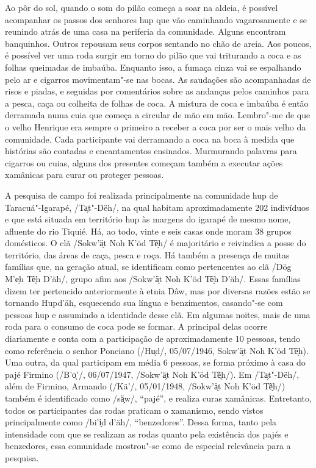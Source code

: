 Ao pôr do sol, quando o som do pilão começa a soar na aldeia, é possível
acompanhar os passos dos senhores hup que vão caminhando vagarosamente e
se reunindo atrás de uma casa na periferia da comunidade. Alguns
encontram banquinhos. Outros repousam seus corpos sentando no chão de
areia. Aos poucos, é possível ver uma roda surgir em torno do pilão que
vai triturando a coca e as folhas queimadas de imbaúba. Enquanto isso, a
fumaça cinza vai se espalhando pelo ar e cigarros movimentam"-se nas
bocas. As saudações são acompanhadas de risos e piadas, e seguidas por
comentários sobre as andanças pelos caminhos para a pesca, caça ou
colheita de folhas de coca. A mistura de coca e imbaúba é então
derramada numa cuia que começa a circular de mão em mão. Lembro"-me de
que o velho Henrique era sempre o primeiro a receber a coca por ser o
mais velho da comunidade. Cada participante vai derramando a coca na
boca à medida que histórias são contadas e encantamentos ensinados.
Murmurando palavras para cigarros ou cuias, alguns dos presentes começam
também a executar ações xamânicas para curar ou proteger pessoas.

A pesquisa de campo foi realizada principalmente na comunidade hup de
Taracuá"-Igarapé, /Ta̗t"-Dëh/, na qual habitam aproximadamente 202
indivíduos e que está situada em território hup às margens do igarapé de
mesmo nome, afluente do rio Tiquié. Há, ao todo, vinte e seis casas onde
moram 38 grupos domésticos. O clã /Sokw'ä̗t Noh K'öd Tẽ̖h/ é majoritário e
reivindica a posse do território, das áreas de caça, pesca e roça. Há
também a presença de muitas famílias que, na geração atual, se
identificam como pertencentes ao clã /Dög M'e̖h Tẽ̖h D'äh/, grupo afim aos
/Sokw'ä̗t Noh K'öd Tẽ̖h D'äh/. Essas famílias dizem ter pertencido
anteriormente à etnia Dâw, mas por diversas razões estão se tornando
Hupd'äh, esquecendo sua língua e benzimentos, casando"-se com pessoas hup
e assumindo a identidade desse clã. Em algumas noites, mais de uma roda
para o consumo de coca pode se formar. A principal delas ocorre
diariamente e conta com a participação de aproximadamente 10 pessoas,
tendo como referência o senhor Ponciano (/Hu̖d/, 05/07/1946, Sokw'ä̗t Noh
K'öd Tẽ̖h). Uma outra, da qual participam em média 6 pessoas, se
forma próximo à casa do pajé Firmino (/B'o̖'/, 06/07/1947, /Sokw'ä̗t Noh
K'öd Tẽ̖h/). Em /Ta̗t"-Dëh/, além de Firmino, Armando (/Kä'/,
05/01/1948, /Sokw'ä̗t Noh K'öd Tẽ̖h/) também é identificado como
/sä̗w/, ``pajé'', e realiza curas xamânicas. Entretanto, todos os
participantes das rodas praticam o xamanismo, sendo vistos
principalmente como /bi'i̖d d'äh/, ``benzedores''. Dessa forma, tanto
pela intensidade com que se realizam as rodas quanto pela existência dos
pajés e benzedores, essa comunidade mostrou"-se como de especial
relevância para a pesquisa.

